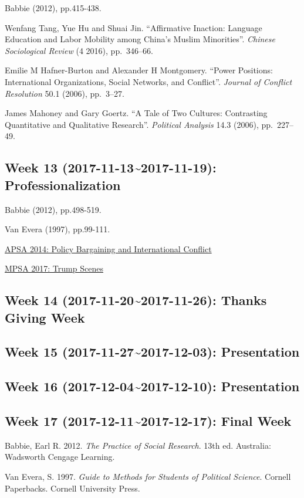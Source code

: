 \documentclass[11pt,]{article}
\begin{document}
Babbie (2012), pp.415-438.

Wenfang Tang, Yue Hu and Shuai Jin. ``Affirmative Inaction: Language
Education and Labor Mobility among China's Muslim Minorities''.
\emph{Chinese Sociological Review} (4 2016), pp.~346--66.

Emilie M Hafner-Burton and Alexander H Montgomery. ``Power Positions:
International Organizations, Social Networks, and Conflict''.
\emph{Journal of Conflict Resolution} 50.1 (2006), pp.~3--27.

James Mahoney and Gary Goertz. ``A Tale of Two Cultures: Contrasting
Quantitative and Qualitative Research''. \emph{Political Analysis} 14.3
(2006), pp.~227--49.

\subsection{Week 13 (2017-11-13\textasciitilde{}2017-11-19):
Professionalization}\label{week-13-2017-11-132017-11-19-professionalization}

Babbie (2012), pp.498-519.

Van Evera (1997), pp.99-111.

\href{https://www.youtube.com/watch?v=bwNBXuz2eRg}{APSA 2014: Policy
Bargaining and International Conflict}

\href{https://www.youtube.com/watch?v=Z4ISkF2H4tk}{MPSA 2017: Trump
Scenes}

\subsection{Week 14 (2017-11-20\textasciitilde{}2017-11-26): Thanks
Giving Week}\label{week-14-2017-11-202017-11-26-thanks-giving-week}

\subsection{Week 15 (2017-11-27\textasciitilde{}2017-12-03):
Presentation}\label{week-15-2017-11-272017-12-03-presentation}

\subsection{Week 16 (2017-12-04\textasciitilde{}2017-12-10):
Presentation}\label{week-16-2017-12-042017-12-10-presentation}

\subsection*{Week 17 (2017-12-11\textasciitilde{}2017-12-17): Final
Week}\label{week-17-2017-12-112017-12-17-final-week}

\hypertarget{refs}{}
\hypertarget{ref-Babbie2012}{}
Babbie, Earl R. 2012. \emph{The Practice of Social Research}. 13th ed.
Australia: Wadsworth Cengage Learning.

\hypertarget{ref-VanEvera1997}{}
Van Evera, S. 1997. \emph{Guide to Methods for Students of Political
Science}. Cornell Paperbacks. Cornell University Press.
\end{document}
